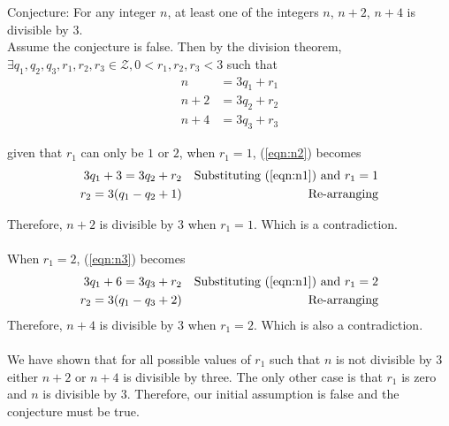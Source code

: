 \documentclass[a4paper]{article}
\begin{document}
Conjecture: For any integer $n$, at least one of the integers $n$, $n+2$, $n+4$ is divisible by $3$.
\\
Assume the conjecture is false. Then by the division theorem,
$\exists q_1,q_2,q_3,r_1,r_2,r_3 \in \mathcal{Z}, 0 < r_1,r_2,r_3 < 3$ such that
\begin{align}
  n &= 3q_1 + r_1 \label{eqn:n1} \\
  n + 2 &= 3q_2 + r_2 \label{eqn:n2} \\
  n + 4 &= 3q_3 + r_3 \label{eqn:n3}
\end{align}

given that $r_1$ can only be $1$ or $2$, when $r_1 = 1$, (\ref{eqn:n2}) becomes
\begin{align*}
  3q_1 + 3 = 3q_2 + r_2 && \text{Substituting (\ref{eqn:n1}) and $r_1 = 1$} \\
  r_2 = 3(q_1 - q_2 + 1) && \text{Re-arranging}
\end{align*}

Therefore, $n+2$ is divisible by 3 when $r_1 = 1$. Which is a contradiction.\\\\
When $r_1 = 2$, (\ref{eqn:n3}) becomes
\begin{align*}
  3q_1 + 6 = 3q_3 + r_2 && \text{Substituting (\ref{eqn:n1}) and $r_1 = 2$} \\
  r_2 = 3(q_1 - q_3 + 2) && \text{Re-arranging}
\end{align*}
Therefore, $n+4$ is divisible by 3 when $r_1 = 2$. Which is also a contradiction.\\\\
We have shown that for all possible values of $r_1$ such that $n$ is not divisible by $3$ either
$n+2$ or $n+4$ is divisible by three. The only other case is that $r_1$ is zero and $n$ is divisible
by $3$.
Therefore, our initial assumption is false and the conjecture must be true.
\end{document}
